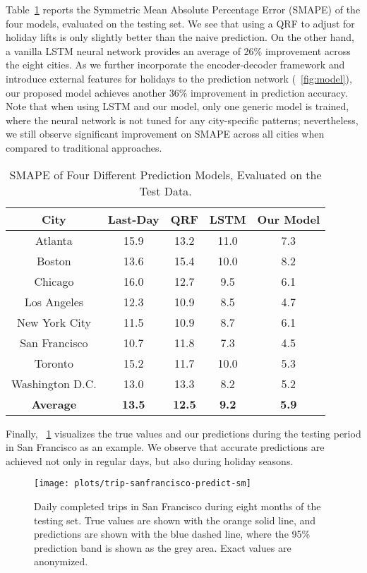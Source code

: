 \documentclass[conference,compsoc,final]{IEEEtran}
\begin{document}
Table~\ref{tab:prediction} reports the Symmetric Mean Absolute Percentage Error (SMAPE) of the four models, evaluated on the testing set. We see that using a QRF to adjust for holiday lifts is only slightly better than the naive prediction. On the other hand, a vanilla LSTM neural network provides an average of 26\% improvement across the eight cities. As we further incorporate the encoder-decoder framework and introduce external features for holidays to the prediction network (\figurename~\ref{fig:model}), our proposed model achieves another 36\% improvement in prediction accuracy. Note that when using LSTM and our model, only one generic model is trained, where the neural network is not tuned for any city-specific patterns; nevertheless, we still observe significant improvement on SMAPE across all cities when compared to traditional approaches. 

\begin{table}[!t]
\renewcommand{\arraystretch}{1.3}
\caption{SMAPE of Four Different Prediction Models, Evaluated on the Test Data.}
\label{tab:prediction}
\centering
\begin{tabular}{| c | c | c | c | c |}
\hline
{\bf City} & {\bf Last-Day} & {\bf QRF} & {\bf LSTM} & {\bf Our Model}\\
\hline
Atlanta & 15.9 & 13.2  & 11.0 & 7.3 \\
\hline
Boston & 13.6 & 15.4 & 10.0 & 8.2 \\
\hline
Chicago & 16.0 & 12.7 & 9.5 & 6.1 \\
\hline
Los Angeles & 12.3 & 10.9 & 8.5 & 4.7 \\
\hline
New York City & 11.5 & 10.9 & 8.7 & 6.1 \\
\hline
San Francisco & 10.7 & 11.8 & 7.3 & 4.5 \\
\hline
Toronto & 15.2 & 11.7 & 10.0 & 5.3 \\
\hline
Washington D.C. & 13.0 & 13.3 & 8.2 & 5.2 \\
\hline
{\bf Average} & {\bf 13.5} & {\bf 12.5} & {\bf 9.2} &  {\bf 5.9} \\
\hline
\end{tabular}
\end{table}

Finally, \figurename~\ref{fig:sf-prediction} visualizes the true values and our predictions during the testing period in San Francisco as an example. We observe that accurate predictions are achieved not only in regular days, but also during holiday seasons.

\begin{figure}[!t]
\centering
\texttt{[image: plots/trip-sanfrancisco-predict-sm]}
\caption{Daily completed trips in San Francisco during eight months of the testing set. True values are shown with the orange solid line, and predictions are shown with the blue dashed line, where the 95\% prediction band is shown as the grey area. Exact values are anonymized. }
\label{fig:sf-prediction}
\end{figure}
\end{document}
